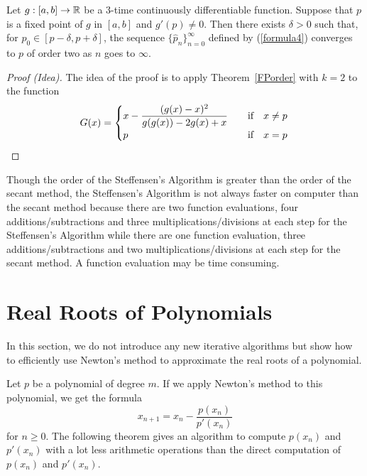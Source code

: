 \begin{theorem}
Let $g:[a,b] \rightarrow \mathbb{R}$ be a $3$-time continuously
differentiable function.  Suppose that $p$ is a fixed point of $g$ in
$[a,b]$ and $g'(p) \not= 0$.  Then there exists $\delta > 0$ such
that, for $p_0 \in [p-\delta, p + \delta]$, the sequence
$\{\hat{p}_n\}_{n=0}^\infty$ defined by (\ref{formula4}) converges to
$p$ of order two as $n$ goes to $\infty$.
\end{theorem}

\begin{proof}[Proof (Idea)]
The idea of the proof is to apply Theorem~\ref{FPorder} with $k=2$ to the
function
\[
G(x) =
\begin{cases}
\displaystyle x - \frac{(g(x)-x)^2}{g(g(x)) -2g(x) + x} & \quad
\text{if} \quad x \neq p \\
p & \quad \text{if} \quad x = p
\end{cases}  \qedhere
\]
\end{proof}

\begin{rmk}
Though the order of the Steffensen's Algorithm is greater than the
order of the secant method, the Steffensen's Algorithm is not always
faster on computer than the secant method because there are two
function evaluations, four additions/subtractions and three
multiplications/divisions at each step for the Steffensen's Algorithm
while there are one function evaluation, three additions/subtractions
and two multiplications/divisions at each step for the secant
method.  A function evaluation may be time consuming.
\end{rmk}

\section{Real Roots of Polynomials}

In this section, we do not introduce any new iterative algorithms but
show how to efficiently use Newton's method to approximate
the real roots of a polynomial.

Let $p$ be a polynomial of degree $m$.  If we apply Newton's method
to this polynomial, we get the formula
\[
x_{n+1} = x_n - \frac{p(x_n)}{p'(x_n)}
\]
for $n \geq 0$.  The following theorem gives an algorithm to compute
$p(x_n)$ and $p'(x_n)$ with a lot less arithmetic operations than the
direct computation of $p(x_n)$ and $p'(x_n)$.


